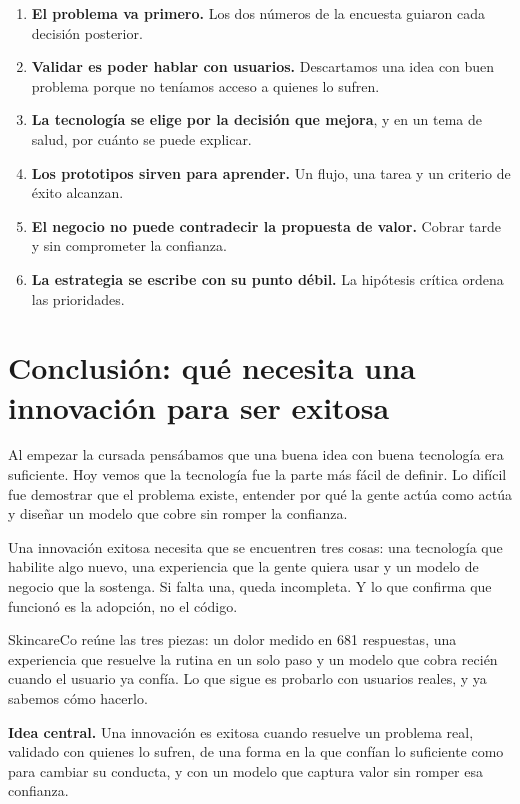 \documentclass[11pt,a4paper]{article}
\begin{document}
\begin{enumerate}
  \item \textbf{El problema va primero.} Los dos números de la encuesta guiaron cada decisión posterior.
  \item \textbf{Validar es poder hablar con usuarios.} Descartamos una idea con buen problema porque no teníamos acceso a quienes lo sufren.
  \item \textbf{La tecnología se elige por la decisión que mejora}, y en un tema de salud, por cuánto se puede explicar.
  \item \textbf{Los prototipos sirven para aprender.} Un flujo, una tarea y un criterio de éxito alcanzan.
  \item \textbf{El negocio no puede contradecir la propuesta de valor.} Cobrar tarde y sin comprometer la confianza.
  \item \textbf{La estrategia se escribe con su punto débil.} La hipótesis crítica ordena las prioridades.
\end{enumerate}

\section{Conclusión: qué necesita una innovación para ser exitosa}

Al empezar la cursada pensábamos que una buena idea con buena tecnología era suficiente. Hoy vemos que la tecnología fue la parte más fácil de definir. Lo difícil fue demostrar que el problema existe, entender por qué la gente actúa como actúa y diseñar un modelo que cobre sin romper la confianza.

Una innovación exitosa necesita que se encuentren tres cosas: una tecnología que habilite algo nuevo, una experiencia que la gente quiera usar y un modelo de negocio que la sostenga. Si falta una, queda incompleta. Y lo que confirma que funcionó es la adopción, no el código.

SkincareCo reúne las tres piezas: un dolor medido en 681 respuestas, una experiencia que resuelve la rutina en un solo paso y un modelo que cobra recién cuando el usuario ya confía. Lo que sigue es probarlo con usuarios reales, y ya sabemos cómo hacerlo.

\medskip
\noindent
\colorbox{acento}{\begin{minipage}{\dimexpr\linewidth-2\fboxsep\relax}
\vspace{6pt}
\color{white}\large
\textbf{Idea central.} Una innovación es exitosa cuando resuelve un problema real, validado con quienes lo sufren, de una forma en la que confían lo suficiente como para cambiar su conducta, y con un modelo que captura valor sin romper esa confianza.
\vspace{6pt}
\end{minipage}}
\end{document}

